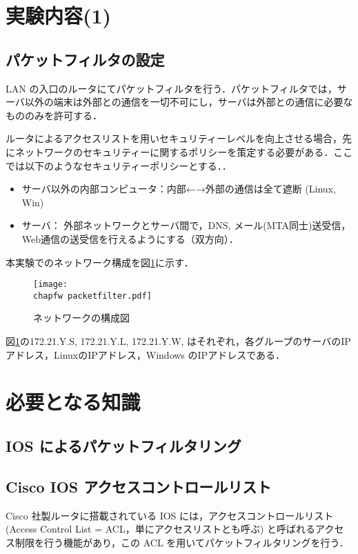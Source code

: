\clearpage

\section{実験内容(1)}

\subsection*{パケットフィルタの設定}

LAN の入口のルータにてパケットフィルタを行う．パケットフィルタでは，サーバ以外の端末は外部との通信を一切不可にし，サーバは外部との通信に必要なもののみを許可する．

ルータによるアクセスリストを用いセキュリティーレベルを向上させる場合，先にネットワークのセキュリティーに関するポリシーを策定する必要がある．ここでは以下のようなセキュリティーポリシーとする．．

\begin{itemize}
 \item サーバ以外の内部コンピュータ：内部←→外部の通信は全て遮断 (Linux, Win)
 \item サーバ： 外部ネットワークとサーバ間で，DNS, メール(MTA同士)送受信，Web通信の送受信を行えるようにする（双方向）．
\end{itemize}
本実験でのネットワーク構成を図\ref{fig:06:packet-filter1}に示す．
\begin{figure}[b]
  \centering
  \texttt{[image: \\chapfw packetfilter.pdf]}
  \caption{ネットワークの構成図}
  \label{fig:06:packet-filter1}
\end{figure}
図\ref{fig:06:packet-filter1}の172.21.Y.S, 172.21.Y.L, 172.21.Y.W, はそれぞれ，各グループのサーバのIPアドレス，LinuxのIPアドレス，Windows のIPアドレスである．

\section{必要となる知識}

\subsection{IOS によるパケットフィルタリング}

\subsection*{Cisco IOS アクセスコントロールリスト}
Cisco 社製ルータに搭載されている IOS には，アクセスコントロールリスト
(Access Control List = ACL，単にアクセスリストとも呼ぶ) と呼ばれるアクセ
ス制限を行う機能があり，この ACL を用いてパケットフィルタリングを行う．


